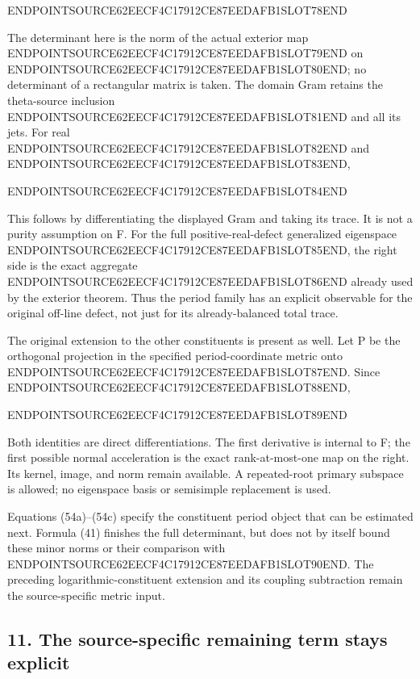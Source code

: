 ENDPOINTSOURCE62EECF4C17912CE87EEDAFB1SLOT78END

The determinant here is the norm of the actual exterior map ENDPOINTSOURCE62EECF4C17912CE87EEDAFB1SLOT79END on ENDPOINTSOURCE62EECF4C17912CE87EEDAFB1SLOT80END; no determinant of a rectangular matrix is taken. The domain Gram retains the theta-source inclusion ENDPOINTSOURCE62EECF4C17912CE87EEDAFB1SLOT81END and all its jets. For real ENDPOINTSOURCE62EECF4C17912CE87EEDAFB1SLOT82END and ENDPOINTSOURCE62EECF4C17912CE87EEDAFB1SLOT83END,

ENDPOINTSOURCE62EECF4C17912CE87EEDAFB1SLOT84END

This follows by differentiating the displayed Gram and taking its trace. It is not a purity assumption on F. For the full positive-real-defect generalized eigenspace ENDPOINTSOURCE62EECF4C17912CE87EEDAFB1SLOT85END, the right side is the exact aggregate ENDPOINTSOURCE62EECF4C17912CE87EEDAFB1SLOT86END already used by the exterior theorem. Thus the period family has an explicit observable for the original off-line defect, not just for its already-balanced total trace.

The original extension to the other constituents is present as well. Let P be the orthogonal projection in the specified period-coordinate metric onto ENDPOINTSOURCE62EECF4C17912CE87EEDAFB1SLOT87END. Since ENDPOINTSOURCE62EECF4C17912CE87EEDAFB1SLOT88END,

ENDPOINTSOURCE62EECF4C17912CE87EEDAFB1SLOT89END

Both identities are direct differentiations. The first derivative is internal to F; the first possible normal acceleration is the exact rank-at-most-one map on the right. Its kernel, image, and norm remain available. A repeated-root primary subspace is allowed; no eigenspace basis or semisimple replacement is used.

Equations (54a)--(54c) specify the constituent period object that can be estimated next. Formula (41) finishes the full determinant, but does not by itself bound these minor norms or their comparison with ENDPOINTSOURCE62EECF4C17912CE87EEDAFB1SLOT90END. The preceding logarithmic-constituent extension and its coupling subtraction remain the source-specific metric input.

\subsection{11. The source-specific remaining term stays explicit}\label{endpoint-sga_trace_period--the-source-specific-remaining-term-stays-explicit}

